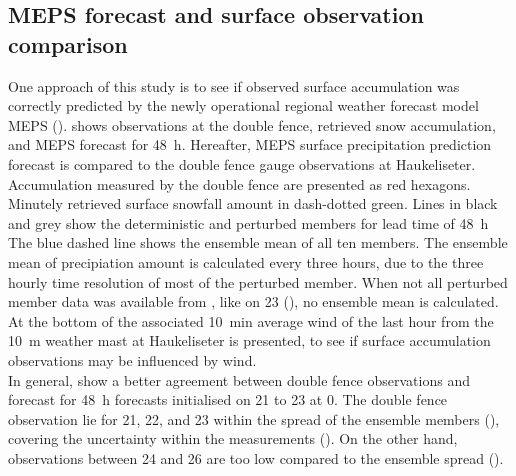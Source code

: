 \subsection{MEPS forecast and surface observation comparison}\label{sec:sfc_acc}
One approach of this study is to see if observed surface accumulation was correctly predicted by the newly operational regional weather forecast model MEPS (). 
 shows observations at the double fence, retrieved snow accumulation, and MEPS forecast for \SI{48}{\hour}. Hereafter, MEPS surface precipitation prediction forecast is compared to the double fence gauge observations at Haukeliseter. 
Accumulation measured by the double fence are presented as red hexagons. Minutely retrieved surface snowfall amount in dash-dotted green. Lines in black and grey show the deterministic and perturbed members for lead time of \SI{48}{\hour}
The blue dashed line shows the ensemble mean of all ten members. The ensemble mean of precipiation amount is calculated every three hours, due to the three hourly time resolution of most of the perturbed member.
When not all perturbed member data was available from \citet{norwegian_meteorological_institute_met_2016}, like on \SI{23}{\dec} (), no ensemble mean is calculated. 
At the bottom of  the associated \SI{10}{\minute} average wind of the last hour from the \SI{10}{\metre} weather mast at Haukeliseter is presented, to see if surface accumulation observations may be influenced by wind. 
\\
In general,  show a better agreement between double fence observations and forecast for \SI{48}{\hour} forecasts initialised on \num{21} to \SI{23}{\dec} at \SI{0}{\UTC}. 
The double fence observation lie for \num{21}, \num{22}, and \SI{23}{\dec} within the spread of the ensemble members (), covering the uncertainty within the measurements (). On the other hand, observations between \num{24} and \SI{26}{\dec} are too low  compared to the ensemble spread ().
